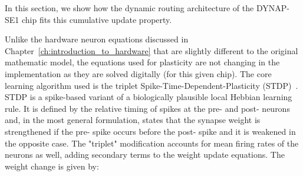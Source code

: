 In this section, we show how the dynamic routing architecture of the DYNAP-SE1 chip fits this cumulative update property.




Unlike the hardware neuron equations discussed in Chapter~\ref{ch:introduction_to_hardware} that are slightly different to the original mathematic model, the equations used for plasticity are not changing in the implementation as they are solved digitally (for this given chip). The core learning algorithm used is the triplet Spike-Time-Dependent-Plasticity (STDP)~\cite{Pfister_Gerstner06}. STDP is a spike-based variant of a biologically plausible local Hebbian learning rule. It is defined by the relative timing of spikes at the pre- and post- neurons and, in the most general formulation, states that the synapse weight is strengthened if the pre- spike occurs before the post- spike and it is weakened in the opposite case. The "triplet" modification accounts for mean firing rates of the neurons as well, adding secondary terms to the weight update equations. The weight change is given by:

